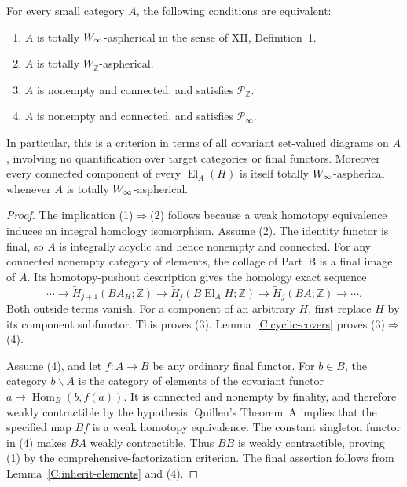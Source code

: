 \begin{theorem}\label{C:classification}
For every small category $A$, the following conditions are equivalent:
\begin{enumerate}
\item $A$ is totally $W_{\infty}$-aspherical in the sense of XII, Definition~1.
\item $A$ is totally $W_{\mathbb Z}$-aspherical.
\item $A$ is nonempty and connected, and satisfies $\mathcal P_{\mathbb Z}$.
\item $A$ is nonempty and connected, and satisfies $\mathcal P_\infty$.
\end{enumerate}
In particular, this is a criterion in terms of all covariant set-valued diagrams on $A$, involving no quantification over target categories or final functors. Moreover every connected component of every $\operatorname{El}_A(H)$ is itself totally $W_{\infty}$-aspherical whenever $A$ is totally $W_{\infty}$-aspherical.
\end{theorem}
\begin{proof}
The implication (1)$\Rightarrow$(2) follows because a weak homotopy equivalence induces an integral homology isomorphism. Assume (2). The identity functor is final, so $A$ is integrally acyclic and hence nonempty and connected. For any connected nonempty category of elements, the collage of Part~B is a final image of $A$. Its homotopy-pushout description gives the homology exact sequence
\[
 \cdots\to\widetilde H_{j+1}(BA_H;\mathbb Z)
 \to\widetilde H_j(B\operatorname{El}_A H;\mathbb Z)
 \to\widetilde H_j(BA;\mathbb Z)\to\cdots.
\]
Both outside terms vanish. For a component of an arbitrary $H$, first replace $H$ by its component subfunctor. This proves (3). Lemma~\ref{C:cyclic-covers} proves (3)$\Rightarrow$(4).

Assume (4), and let $f:A\to B$ be any ordinary final functor. For $b\in B$, the category $b\backslash A$ is the category of elements of the covariant functor $a\mapsto\operatorname{Hom}_B(b,f(a))$. It is connected and nonempty by finality, and therefore weakly contractible by the hypothesis. Quillen's Theorem~A \citep[Section~1, Theorem~A]{Quillen1973} implies that the specified map $Bf$ is a weak homotopy equivalence. The constant singleton functor in (4) makes $BA$ weakly contractible. Thus $BB$ is weakly contractible, proving (1) by the comprehensive-factorization criterion. The final assertion follows from Lemma~\ref{C:inherit-elements} and (4).
\end{proof}

